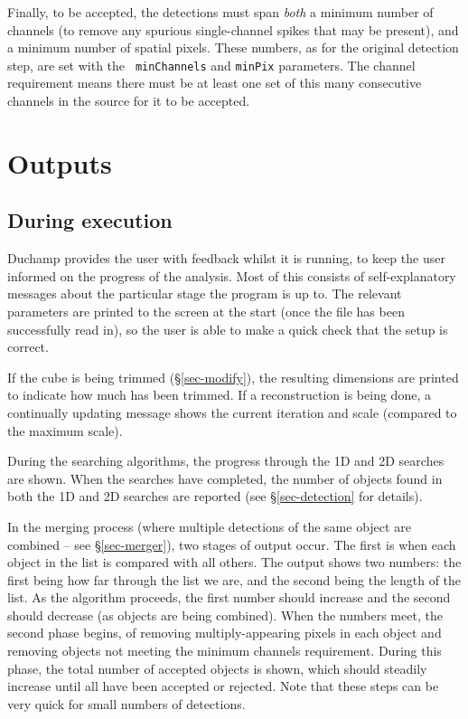 \documentclass[12pt,a4paper]{article}
\begin{document}
Finally, to be accepted, the detections must span {\it both} a minimum
number of channels (to remove any spurious single-channel spikes that
may be present), and a minimum number of spatial pixels. These
numbers, as for the original detection step, are set with the {\tt
minChannels} and {\tt minPix} parameters. The channel requirement
means there must be at least one set of this many consecutive channels
in the source for it to be accepted.

\section{Outputs}
\label{sec-output}

\subsection{During execution}

Duchamp provides the user with feedback whilst it is running, to
keep the user informed on the progress of the analysis. Most of this
consists of self-explanatory messages about the particular stage the
program is up to. The relevant parameters are printed to the screen at
the start (once the file has been successfully read in), so the user
is able to make a quick check that the setup is correct.

If the cube is being trimmed (\S\ref{sec-modify}), the resulting
dimensions are printed to indicate how much has been trimmed. If a
reconstruction is being done, a continually updating message shows the
current iteration and scale (compared to the maximum scale). 

During the searching algorithms, the progress through the 1D and 2D
searches are shown. When the searches have completed,
the number of objects found in both the 1D and 2D searches are
reported (see \S\ref{sec-detection} for details).

In the merging process (where multiple detections of the same object
are combined -- see \S\ref{sec-merger}), two stages of output
occur. The first is when each object in the list is compared with all
others. The output shows two numbers: the first being how far through
the list we are, and the second being the length of the list. As the
algorithm proceeds, the first number should increase and the second
should decrease (as objects are being combined). When the numbers
meet, the second phase begins, of removing multiply-appearing pixels
in each object and removing objects not meeting the minimum channels
requirement. During this phase, the total number of accepted objects
is shown, which should steadily increase until all have been accepted
or rejected. Note that these steps can be very quick for small numbers
of detections.
\end{document}
